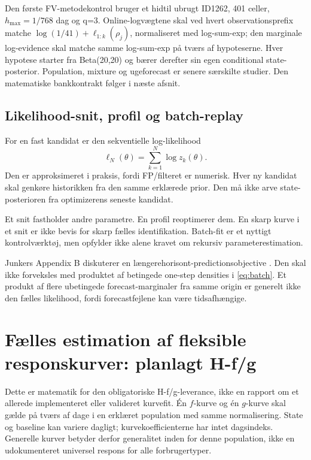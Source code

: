 Den første FV-metodekontrol bruger et hidtil ubrugt ID1262, 401 celler,
\(h_{\max}=1/768\) dag og q=3. Online-logvægtene skal ved hvert
observationsprefix matche \(\log(1/41)+\ell_{1:k}(\rho_j)\), normaliseret med
log-sum-exp; den marginale log-evidence skal matche samme log-sum-exp på tværs
af hypoteserne. Hver hypotese starter fra Beta(20,20) og bærer derefter sin egen
conditional state-posterior. Population, mixture og ugeforecast er senere særskilte
studier. Den matematiske bankkontrakt følger i næste afsnit.


\subsection{Likelihood-snit, profil og batch-replay}
For en fast kandidat er den sekventielle log-likelihood
\begin{equation}
 \ell_N(\theta)=\sum_{k=1}^N\log z_k(\theta).
 \label{eq:batch}
\end{equation}
Den er approksimeret i praksis, fordi FP/filteret er numerisk. Hver ny kandidat skal genkøre historikken fra den samme erklærede prior. Den må ikke arve state-posterioren fra optimizerens seneste kandidat.

Et snit fastholder andre parametre. En profil reoptimerer dem. En skarp kurve i et snit er ikke bevis for skarp fælles identifikation. Batch-fit er et nyttigt kontrolværktøj, men opfylder ikke alene kravet om rekursiv parameterestimation.

Junkers Appendix B diskuterer en længerehorisont-predictionsobjective \cite{junker}. Den skal ikke forveksles med produktet af betingede one-step densities i \eqref{eq:batch}. Et produkt af flere ubetingede forecast-marginaler fra samme origin er generelt ikke den fælles likelihood, fordi forecastfejlene kan være tidsafhængige.

\section{Fælles estimation af fleksible responskurver: planlagt H-f/g}
\label{sec:sharedresponse}
Dette er matematik for den obligatoriske H-f/g-leverance, ikke en rapport om et
allerede implementeret eller valideret kurvefit. Én \(f\)-kurve og én \(g\)-kurve
skal gælde på tværs af dage i en erklæret population med samme normalisering.
State og baseline kan variere dagligt; kurvekoefficienterne har intet dagsindeks.
Generelle kurver betyder derfor generalitet inden for denne population, ikke en
udokumenteret universel respons for alle forbrugertyper.

